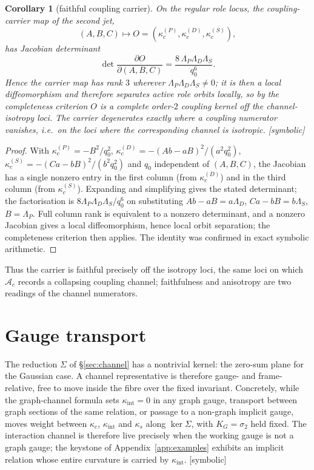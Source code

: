 \documentclass[11pt]{article}
\newcommand{\Symbolic}{\textsf{[symbolic]}}
\theoremstyle{plain}
\newtheorem{corollary}{Corollary}
\theoremstyle{definition}
\newcommand{\KG}{K_{G}}
\newcommand{\Ac}{\mathcal{A}_c}
\newcommand{\kc}{\kappa_{c}}
\newcommand{\kint}{\kappa_{\mathrm{int}}}
\newcommand{\ks}{\kappa_{s}}
\newcommand{\kcrole}[1]{\kappa_{c}^{(#1)}}   %
\begin{document}
\begin{corollary}[faithful coupling carrier]
\label{cor:faithful}
On the regular role locus, the coupling-carrier map of the second jet,
\[
(A,B,C)\longmapsto O=(\kcrole{P},\kcrole{D},\kcrole{S}),
\]
has Jacobian determinant
\[
\det\frac{\partial O}{\partial(A,B,C)}=\frac{8\,\Lambda_P\Lambda_D\Lambda_S}{q_0^{6}} .
\]
Hence the carrier map has rank $3$ wherever $\Lambda_P\Lambda_D\Lambda_S\ne0$; it is then a local
diffeomorphism and therefore separates active role orbits locally, so by the completeness criterion
$O$ is a complete order-$2$ coupling kernel off the channel-isotropy loci. The carrier degenerates
exactly where a coupling numerator vanishes, i.e.\ on the loci where the corresponding channel is
isotropic. \Symbolic
\end{corollary}

\begin{proof}
With $\kcrole{P}=-B^2/q_0^2$, $\kcrole{D}=-(Ab-aB)^2/(a^2q_0^2)$,
$\kcrole{S}=-(Ca-bB)^2/(b^2q_0^2)$ and $q_0$ independent of $(A,B,C)$, the Jacobian has a single
nonzero entry in the first column (from $\kcrole{D}$) and in the third column (from $\kcrole{S}$).
Expanding and simplifying gives the stated determinant; the factorisation is
$8\Lambda_P\Lambda_D\Lambda_S/q_0^6$ on substituting $Ab-aB=a\Lambda_D$, $Ca-bB=b\Lambda_S$,
$B=\Lambda_P$. Full column rank is equivalent to a nonzero determinant, and a nonzero Jacobian gives a
local diffeomorphism, hence local orbit separation; the completeness criterion then applies. The
identity was confirmed in exact symbolic arithmetic.
\end{proof}

Thus the carrier is faithful precisely off the isotropy loci, the same loci on which $\Ac$ records a
collapsing coupling channel; faithfulness and anisotropy are two readings of the channel numerators.

\section{Gauge transport}
\label{sec:transport}

The reduction $\Sigma$ of \S\ref{sec:channel} has a nontrivial kernel: the zero-sum plane for the
Gaussian case. A channel representative is therefore gauge- and frame-relative, free to move inside
the fibre over the fixed invariant. Concretely, while the graph-channel formula sets $\kint=0$ in any
graph gauge, transport between graph sections of the same relation, or passage to a non-graph
implicit gauge, moves weight between $\kc$, $\kint$ and $\ks$ along $\ker\Sigma$, with $\KG=\sigma_2$
held fixed. The interaction channel is therefore live precisely when the working gauge is not a graph
gauge; the keystone of Appendix~\ref{app:examples} exhibits an implicit relation whose entire
curvature is carried by $\kint$. \Symbolic
\end{document}
